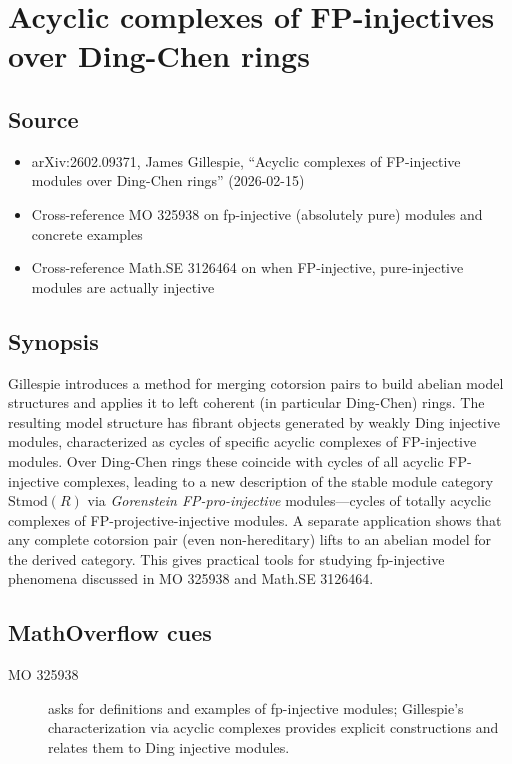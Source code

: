 \section*{Acyclic complexes of FP-injectives over Ding-Chen rings}
\subsection*{Source}
\begin{itemize}
  \item arXiv:2602.09371, James Gillespie, ``Acyclic complexes of FP-injective modules over Ding-Chen rings'' (2026-02-15)
  \item Cross-reference MO 325938 on fp-injective (absolutely pure) modules and concrete examples
  \item Cross-reference Math.SE 3126464 on when FP-injective, pure-injective modules are actually injective
\end{itemize}
\subsection*{Synopsis}
Gillespie introduces a method for merging cotorsion pairs to build abelian model structures and applies it to left coherent (in particular Ding-Chen) rings. The resulting model structure has fibrant objects generated by weakly Ding injective modules, characterized as cycles of specific acyclic complexes of FP-injective modules. Over Ding-Chen rings these coincide with cycles of all acyclic FP-injective complexes, leading to a new description of the stable module category $\mathrm{Stmod}(R)$ via \emph{Gorenstein FP-pro-injective} modules—cycles of totally acyclic complexes of FP-projective-injective modules. A separate application shows that any complete cotorsion pair (even non-hereditary) lifts to an abelian model for the derived category. This gives practical tools for studying fp-injective phenomena discussed in MO 325938 and Math.SE 3126464.
\subsection*{MathOverflow cues}
\begin{description}
  \item[MO 325938] asks for definitions and examples of fp-injective modules; Gillespie’s characterization via acyclic complexes provides explicit constructions and relates them to Ding injective modules.
\end{description}
